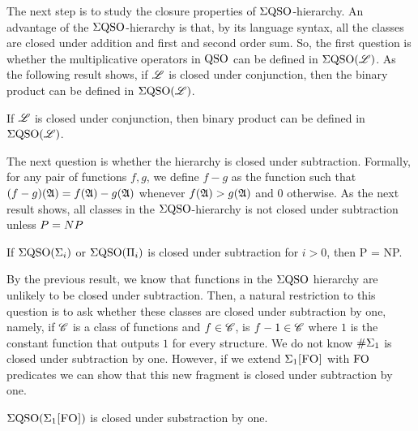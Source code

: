 The next step is to study the closure properties of $\Sigma{\rm QSO}$-hierarchy. 
An advantage of the $\Sigma{\rm QSO}$-hierarchy is that, by its language syntax, all the classes are closed under addition and first and second order sum.
So, the first question is whether the multiplicative operators in ${\rm QSO}$ can be defined in $\Sigma{\rm QSO}(\mathscr{L})$. As the following result shows, if $\mathscr{L}$ is closed under conjunction, then the binary product can be defined in  $\Sigma{\rm QSO}(\mathscr{L})$.
\begin{theorem}\label{theo:binary-prod}
	If $\mathscr{L}$ is closed under conjunction, then binary product can be defined in $\Sigma{\rm QSO}(\mathscr{L})$.
\end{theorem}
The next question is whether the hierarchy is closed under subtraction. Formally, for any pair of functions $f,g$, we define $f - g$ as the function such that $(f - g)(\mathfrak{A}) = f(\mathfrak{A})-g(\mathfrak{A})$ whenever $f(\mathfrak{A})>g(\mathfrak{A})$ and $0$ otherwise.
As the next result shows, all classes in the $\Sigma{\rm QSO}$-hierarchy is not closed under subtraction unless ${\sc P} = {\sc NP}$
\begin{theorem} \label{sub-pnp}
If $\Sigma{\rm QSO}(\Sigma_{i})$ or $\Sigma{\rm QSO}(\Pi_{i})$ is closed under subtraction for $i > 0$, then {\sc P} = {\sc NP}.
\end{theorem}

By the previous result, we know that functions in the $\Sigma{\rm QSO}$ hierarchy are unlikely to be closed under subtraction. Then, a natural restriction to this question is to ask whether these classes are closed under subtraction by one, namely, if $\mathscr{C}$ is a class of functions and $f \in \mathscr{C}$, is $f-1 \in \mathscr{C}$ where $1$ is the constant function that outputs $1$ for every structure. 
We do not know $\#\Sigma_{1}$ is closed under subtraction by one. However, if we extend $\Sigma_{1}\textsc{[FO]}$ with ${\rm FO}$ predicates we can show that this new fragment is closed under subtraction by one.
\begin{theorem} \label{sigmafo-minusone}
	$\Sigma{\rm QSO}(\Sigma_{1}\textsc{[FO]})$ is closed under substraction by one.
\end{theorem}


 



